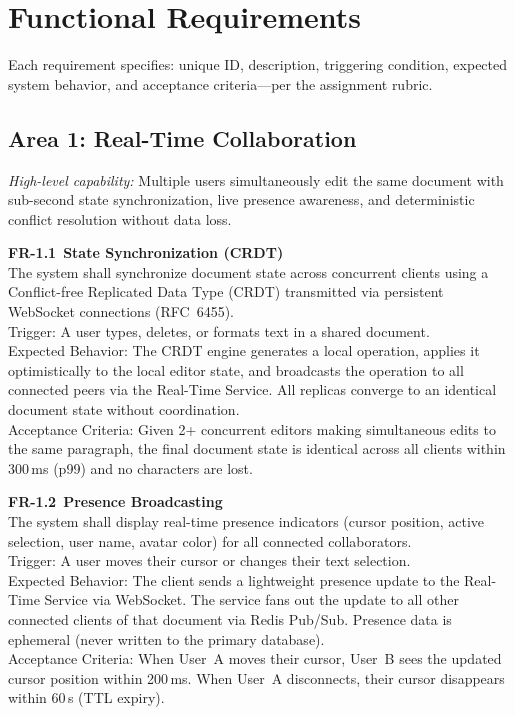 \documentclass[10pt, a4paper]{article}
\newcommand{\requirement}[1]{\textcolor{accent}{\textsf{\textbf{#1}}}}
\newcommand{\lightrule}{{\color{border}\rule{\textwidth}{0.4pt}}}
\newcommand{\frcard}[6]{%
\vspace{4pt}
\noindent\begin{minipage}{\textwidth}
\noindent\requirement{#1}~\textbf{#2}\\[2pt]
{\small\color{inkSoft}#3}\\[3pt]
{\small\color{inkMuted}\textsf{Trigger:}} {\small #4}\\[1pt]
{\small\color{inkMuted}\textsf{Expected Behavior:}} {\small #5}\\[1pt]
{\small\color{inkMuted}\textsf{Acceptance Criteria:}} {\small #6}
\end{minipage}
\vspace{4pt}\lightrule\vspace{2pt}
}
\begin{document}
\section{Functional Requirements}

\begin{decisionbox}
\small Each requirement specifies: unique ID, description, triggering condition, expected system behavior, and acceptance criteria---per the assignment rubric.
\end{decisionbox}

\subsection{Area 1: Real-Time Collaboration}

{\small\textit{High-level capability:} Multiple users simultaneously edit the same document with sub-second state synchronization, live presence awareness, and deterministic conflict resolution without data loss.}

\frcard{FR-1.1}{State Synchronization (CRDT)}{The system shall synchronize document state across concurrent clients using a Conflict-free Replicated Data Type (CRDT) transmitted via persistent WebSocket connections (RFC~6455).}{A user types, deletes, or formats text in a shared document.}{The CRDT engine generates a local operation, applies it optimistically to the local editor state, and broadcasts the operation to all connected peers via the Real-Time Service. All replicas converge to an identical document state without coordination.}{Given 2+ concurrent editors making simultaneous edits to the same paragraph, the final document state is identical across all clients within 300\,ms (p99) and no characters are lost.}

\frcard{FR-1.2}{Presence Broadcasting}{The system shall display real-time presence indicators (cursor position, active selection, user name, avatar color) for all connected collaborators.}{A user moves their cursor or changes their text selection.}{The client sends a lightweight presence update to the Real-Time Service via WebSocket. The service fans out the update to all other connected clients of that document via Redis Pub/Sub. Presence data is ephemeral (never written to the primary database).}{When User~A moves their cursor, User~B sees the updated cursor position within 200\,ms. When User~A disconnects, their cursor disappears within 60\,s (TTL expiry).}
\end{document}
